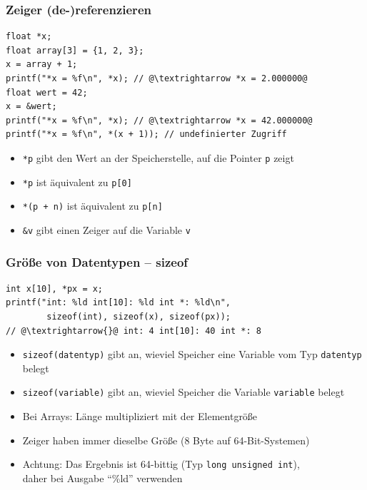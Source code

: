 \documentclass{slides}
\begin{document}
\begin{frame}[fragile]
  \frametitle{Zeiger (de-)referenzieren}
\begin{lstlisting}
float *x;
float array[3] = {1, 2, 3};
x = array + 1;
printf("*x = %f\n", *x); // @\textrightarrow *x = 2.000000@
float wert = 42;
x = &wert;
printf("*x = %f\n", *x); // @\textrightarrow *x = 42.000000@
printf("*x = %f\n", *(x + 1)); // undefinierter Zugriff
\end{lstlisting}

  \begin{itemize}
  \item \lstinline!*p! gibt den Wert an der Speicherstelle, auf die Pointer \lstinline!p! zeigt
  \item \lstinline!*p! ist äquivalent zu \lstinline!p[0]!
  \item \lstinline!*(p + n)! ist äquivalent zu \lstinline!p[n]!
  \item \lstinline!&v! gibt einen Zeiger auf die Variable \lstinline!v!
  \end{itemize}
\end{frame}

\begin{frame}[fragile]
  \frametitle{Größe von Datentypen -- sizeof}

\begin{lstlisting}
int x[10], *px = x;
printf("int: %ld int[10]: %ld int *: %ld\n",
        sizeof(int), sizeof(x), sizeof(px));
// @\textrightarrow{}@ int: 4 int[10]: 40 int *: 8
\end{lstlisting}

  \begin{itemize}
  \item \lstinline!sizeof(datentyp)! gibt an, wieviel Speicher eine Variable vom Typ \lstinline!datentyp! belegt
  \item \lstinline!sizeof(variable)! gibt an, wieviel Speicher die Variable \lstinline!variable! belegt
  \item Bei Arrays: Länge multipliziert mit der Elementgröße
  \item Zeiger haben immer dieselbe Größe (8 Byte auf 64-Bit-Systemen)
  \item Achtung: Das Ergebnis ist 64-bittig (Typ \lstinline!long unsigned int!),\\
    daher bei Ausgabe "`\%ld"' verwenden
  \end{itemize}
\end{frame}
\end{document}
